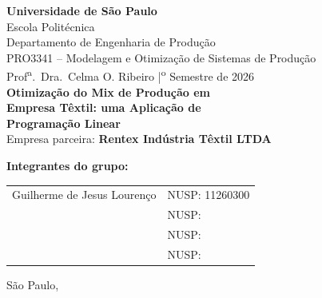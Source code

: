 \begin{titlepage}
\centering

\vspace*{0.5cm}
{\large\bfseries Universidade de São Paulo}\\[0.3cm]
{\large Escola Politécnica}\\[0.1cm]
{\normalsize Departamento de Engenharia de Produção}\\[2.0cm]

{\large PRO3341 -- Modelagem e Otimização de Sistemas de Produção}\\[0.3cm]
{\normalsize Prof\textsuperscript{a}.\ Dra.\ Celma O. Ribeiro \quad|\textsuperscript{o} Semestre de 2026}\\[3.0cm]

{\LARGE\bfseries Otimização do Mix de Produção em\\[0.3cm]
Empresa Têxtil: uma Aplicação de\\[0.3cm]
Programação Linear}\\[1.0cm]

{\large Empresa parceira: \textbf{Rentex Indústria Têxtil LTDA}}\\[3.5cm]

\begin{flushleft}
\textbf{Integrantes do grupo:}\\[0.5cm]
\begin{tabular}{ll}
  Guilherme de Jesus Lourenço & NUSP: 11260300 \\[0.3cm]
  \underline{\hspace{7cm}} & NUSP: \underline{\hspace{2.5cm}} \\[0.3cm]
  \underline{\hspace{7cm}} & NUSP: \underline{\hspace{2.5cm}} \\[0.3cm]
  \underline{\hspace{7cm}} & NUSP: \underline{\hspace{2.5cm}} \\
\end{tabular}
\end{flushleft}

\vfill
{\normalsize São Paulo, \the\year}

\end{titlepage}
\newpage
